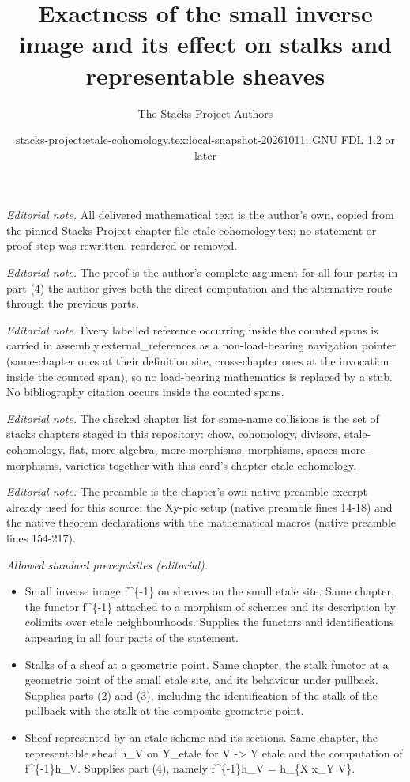 \documentclass[10pt,a4paper]{amsart}
\title{Exactness of the small inverse image and its effect on stalks and representable sheaves}
\author{The Stacks Project Authors}
\date{stacks-project:etale-cohomology.tex:local-snapshot-20261011; GNU FDL 1.2 or later}
\theoremstyle{plain}
\theoremstyle{definition}
\theoremstyle{remark}
\numberwithin{equation}{subsection}
\begin{document}
\maketitle
\noindent\textit{Editorial note.} All delivered mathematical text is the author's own, copied from the pinned Stacks Project chapter file etale-cohomology.tex; no statement or proof step was rewritten, reordered or removed.\par\medskip
\noindent\textit{Editorial note.} The proof is the author's complete argument for all four parts; in part (4) the author gives both the direct computation and the alternative route through the previous parts.\par\medskip
\noindent\textit{Editorial note.} Every labelled reference occurring inside the counted spans is carried in assembly.external\_references as a non-load-bearing navigation pointer (same-chapter ones at their definition site, cross-chapter ones at the invocation inside the counted span), so no load-bearing mathematics is replaced by a stub. No bibliography citation occurs inside the counted spans.\par\medskip
\noindent\textit{Editorial note.} The checked chapter list for same-name collisions is the set of stacks chapters staged in this repository: chow, cohomology, divisors, etale-cohomology, flat, more-algebra, more-morphisms, morphisms, spaces-more-morphisms, varieties together with this card's chapter etale-cohomology.\par\medskip
\noindent\textit{Editorial note.} The preamble is the chapter's own native preamble excerpt already used for this source: the Xy-pic setup (native preamble lines 14-18) and the native theorem declarations with the mathematical macros (native preamble lines 154-217).\par\medskip
\noindent\textit{Allowed standard prerequisites (editorial).}\begin{itemize}
\item Small inverse image f\textasciicircum{}\{-1\} on sheaves on the small etale site. Same chapter, the functor f\textasciicircum{}\{-1\} attached to a morphism of schemes and its description by colimits over etale neighbourhoods. Supplies the functors and identifications appearing in all four parts of the statement.
\item Stalks of a sheaf at a geometric point. Same chapter, the stalk functor at a geometric point of the small etale site, and its behaviour under pullback. Supplies parts (2) and (3), including the identification of the stalk of the pullback with the stalk at the composite geometric point.
\item Sheaf represented by an etale scheme and its sections. Same chapter, the representable sheaf h\_V on Y\_etale for V -> Y etale and the computation of f\textasciicircum{}\{-1\}h\_V. Supplies part (4), namely f\textasciicircum{}\{-1\}h\_V = h\_\{X x\_Y V\}.
\end{itemize}\medskip
\end{document}
